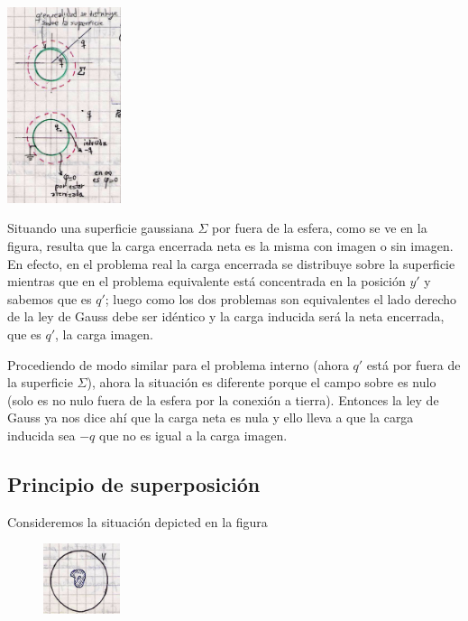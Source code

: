 \documentclass[10pt,oneside]{CBFT_book}
\begin{document}
	\includegraphics[width=0.25\textwidth]{images/fig_ft1_calculo_carga_fast.jpg}	 

Situando una superficie gaussiana $\Sigma$ por fuera de la esfera, como se ve en la figura, resulta que la
carga encerrada neta es la misma con imagen o sin imagen. En efecto, en el problema real la carga encerrada
se distribuye sobre la superficie mientras que en el problema equivalente está concentrada en la posición
$y'$ y sabemos que es $q'$; luego como los dos problemas son equivalentes el lado derecho de la ley de 
Gauss debe ser idéntico y la carga inducida será la neta encerrada, que es $q'$, la carga imagen.

Procediendo de modo similar para el problema interno (ahora $q'$ está por fuera de la superficie $\Sigma$),
ahora la situación es diferente porque el campo sobre \Sigma es nulo (solo es no nulo fuera de la esfera
por la conexión a tierra). Entonces la ley de Gauss ya nos dice ahí que la carga neta es nula y ello
lleva a que la carga inducida sea $-q$ que no es igual a la carga imagen.


\subsection{Principio de superposición}

Consideremos la situación depicted en la figura

\begin{figure}[htb]
	\begin{center}
	\includegraphics[width=0.2\textwidth]{images/fig_ft1_rho_rodeada_por_V.jpg}	 
	\end{center}
	\caption{}
\end{figure} 
\end{document}
